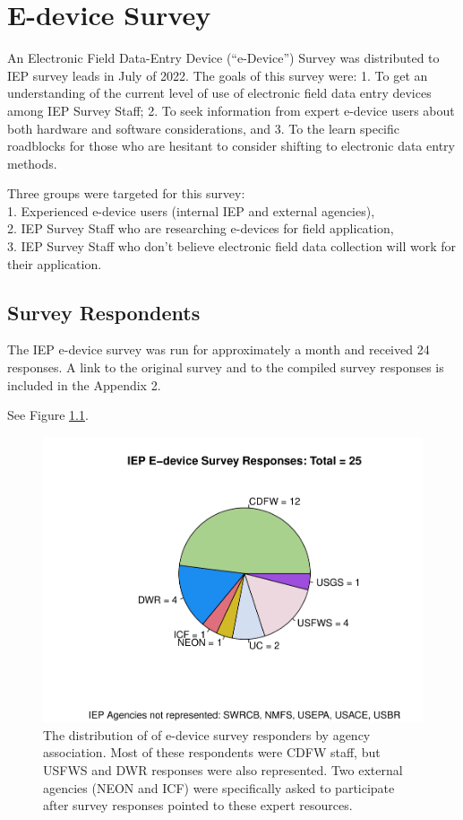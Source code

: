 \documentclass[
]{book}
\theoremstyle{definition}
\theoremstyle{definition}
\theoremstyle{definition}
\theoremstyle{definition}
\theoremstyle{remark}
\begin{document}
\hypertarget{cross}{%
\chapter{E-device Survey}\label{cross}}

An Electronic Field Data-Entry Device (``e-Device'') Survey was distributed to IEP survey leads in July of 2022. The goals of this survey were: 1. To get an understanding of the current level of use of electronic field data entry devices among IEP Survey Staff; 2. To seek information from expert e-device users about both hardware and software considerations, and 3. To the learn specific roadblocks for those who are hesitant to consider shifting to electronic data entry methods.

Three groups were targeted for this survey:\\
1. Experienced e-device users (internal IEP and external agencies),\\
2. IEP Survey Staff who are researching e-devices for field application,\\
3. IEP Survey Staff who don't believe electronic field data collection will work for their application.

\hypertarget{survey-respondents}{%
\section{Survey Respondents}\label{survey-respondents}}

The IEP e-device survey was run for approximately a month and received 24 responses. A link to the original survey and to the compiled survey responses is included in the Appendix 2.

See Figure \ref{fig:survey}.

\begin{figure}

{\centering \includegraphics[width=0.8\linewidth]{02-survey_files/figure-latex/survey-1} 

}

\caption{The distribution of of e-device survey responders by agency association. Most of these respondents were CDFW staff, but USFWS and DWR responses were also represented.  Two external agencies (NEON and ICF) were specifically asked to participate after survey responses pointed to these expert resources.}\label{fig:survey}
\end{figure}
\end{document}
